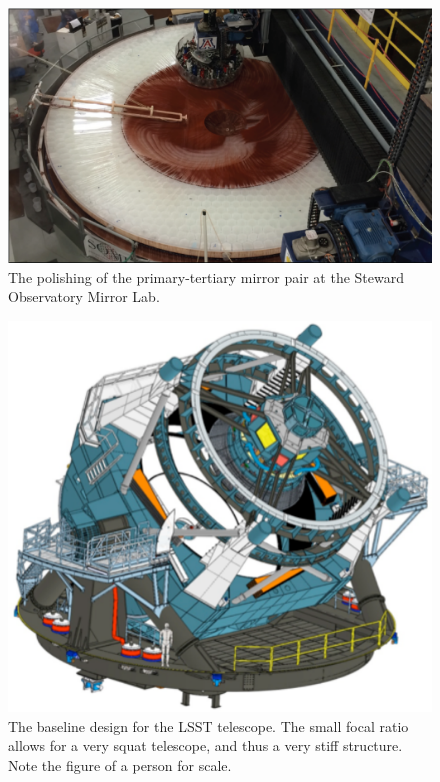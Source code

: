\documentclass{emulateapj}
\begin{document}
\begin{figure}
\includegraphics[width=1.0\hsize,clip]{polishing.pdf}
\caption{The polishing of the primary-tertiary mirror pair at the Steward Observatory Mirror Lab.} 
\label{Fig:polishing}
\end{figure}




\begin{figure}
\includegraphics[width=1.0\hsize,clip]{telescopeGreen.pdf}
\caption{The baseline design for the 
LSST telescope.  The small focal ratio allows for a very squat
telescope, and thus a very stiff structure.  Note the figure of a person for scale.} 
\label{Fig:telescope}
\end{figure}
\end{document}
